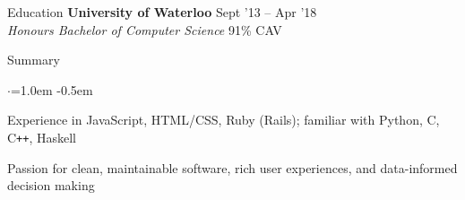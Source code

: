 \documentclass{resume} %
\begin{document}

\begin{rSection}{Education}
  {\bf University of Waterloo} \hfill {Sept '13 -- Apr '18} \\
  {\em Honours Bachelor of Computer Science} \hfill {91\% CAV}
  \vspace{0.5em}
\end{rSection}



\begin{rSection}{Summary}
  \vspace {0.5em}
  \begin{list}{$\cdot$}{\leftmargin=1.0em}
    \itemsep -0.5em \vspace{-0.5em}
    \item Experience in JavaScript, HTML/CSS, Ruby (Rails); familiar with Python, C, C\texttt{++}, Haskell
    \item Passion for clean, maintainable software, rich user experiences, and data-informed decision making
  \end{list}
  \vspace{0.5em}
\end{rSection}

\end{document}
